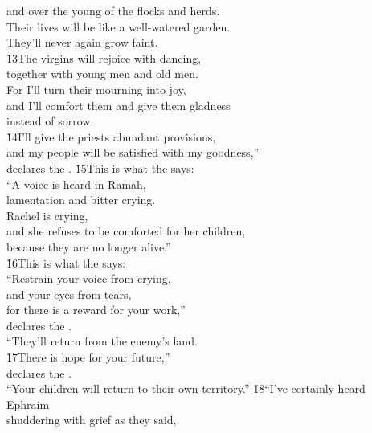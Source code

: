 \begin{poetry}
\poemlll       and over the young of the flocks and herds. \\
\poeml Their lives will be like a well-watered garden. \\
\poemll    They'll never again grow faint. \\
\poeml \v{13}The virgins will rejoice with dancing, \\
\poemll    together with young men and old men. \\
\poeml For I'll turn their mourning into joy, \\
\poemll    and I'll comfort them and give them gladness \\
\poemlll       instead of sorrow. \\
\poeml \v{14}I'll give the priests abundant provisions, \\
\poemll    and my people will be satisfied with my goodness,'' \\
\poemlll       declares the .
\poeml \v{15}This is what the  says: \\
\poeml ``A voice is heard in Ramah, \\
\poemll    lamentation and bitter crying. \\
\poeml Rachel is crying, \\
\poemll    and she refuses to be comforted for her children, \\
\poemlll       because they are no longer alive.'' \\
\poeml \v{16}This is what the  says: \\
\poeml ``Restrain your voice from crying, \\
\poemll    and your eyes from tears, \\
\poeml for there is a reward for your work,'' \\
\poemll    declares the . \\
\poemlll       ``They'll return from the enemy's land. \\
\poeml \v{17}There is hope for your future,'' \\
\poemll    declares the . \\
\poeml ``Your children will return to their own territory.''
\poeml \v{18}``I've certainly heard Ephraim \\
\poemll    shuddering with grief as they said, \\

\end{poetry}
